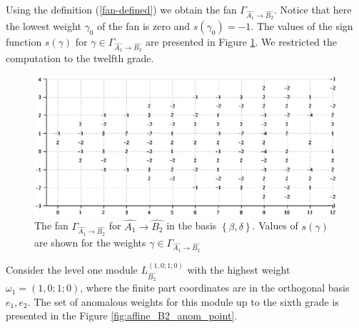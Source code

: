 \documentclass[12pt]{iopart}
\theoremstyle{definition}
\begin{document}
Using the definition (\ref{fan-defined}) we obtain the fan
$\Gamma_{\hat{A_1} \longrightarrow  \hat{B_2} }$.
Notice that here the lowest weight  $\gamma_0$ of the fan  is zero and $s\left( \gamma_0 \right)=-1$.
The values of the sign function $s(\gamma)$ for
$ \gamma \in \Gamma_{\hat{A_1} \longrightarrow  \hat{B_2} }$ are presented in Figure \ref{fig:AffineB2A1Fan}.
We restricted the computation to the twelfth grade.
\begin{figure}[h!bt]
  \centering
  \includegraphics[width=135mm]{figure10.eps}
  \caption{The fan $\Gamma_{\hat{A_1}\rightarrow \hat{B_2}}$
  for $\hat{A_1}\rightarrow \hat{B_2}$ in the basis $\left\{\beta,\delta \right\}$. Values of  $s(\gamma)$ are shown for the
  weights $\gamma\in \Gamma_{\hat{A_1}\rightarrow \hat{B_2}}$}
  \label{fig:AffineB2A1Fan}
\end{figure}


Consider the level one module $L^{\left( 1,0;1;0 \right)}_{\hat{B_2}}$  with the highest weight $\omega_1=(1,0;1;0)$,
where the finite part coordinates are in the orthogonal basis $e_1,e_2$.
The set of anomalous weights for this module up to the sixth grade is presented in the Figure \ref{fig:affine_B2_anom_point}.
\end{document}
